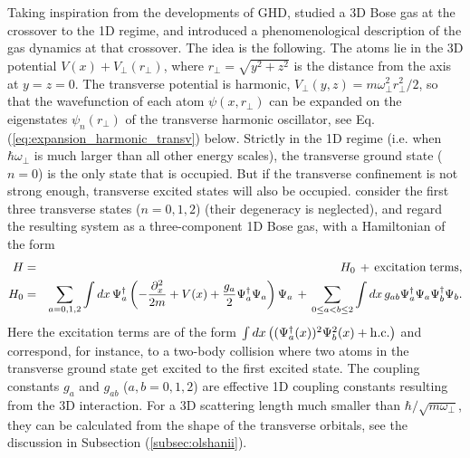 \documentclass[onecolumn,amsfonts,showpacs,superscriptaddress]{revtex4-1}
\newcommand{\comJ}[1]{{\color{orange}#1}}
\begin{document}
Taking inspiration from the developments of GHD,  \cite{moller_extension_2021} studied a 3D Bose gas at the crossover to the 1D regime, and introduced a phenomenological description of the gas dynamics at that crossover. The idea is the following. The atoms lie in the 3D potential $V(x) + V_{\perp} (r_\perp)$, where $r_\perp = \sqrt{y^2+z^2}$ is the distance from the axis at $y=z=0$. The transverse potential is harmonic, $V_{\perp} (y,z) = m \omega_\perp^2 r_\perp^2/2$, so that the wavefunction of each atom $\psi(x,r_\perp)$ can be expanded on the eigenstates $\psi_n(r_\perp)$ of the transverse harmonic oscillator, see Eq.~ (\ref{eq:expansion_harmonic_transv}) below. Strictly in the 1D regime (i.e. when $\hbar \omega_\perp$ is much larger than all other energy scales), the transverse ground state ($n=0$) is  the only state that is occupied. But if the transverse confinement is not strong enough, transverse excited states will also be occupied. \cite{moller_extension_2021} consider the first three transverse states ($n=0,1,2$) (their degeneracy is neglected), and regard the resulting system as a three-component 1D Bose gas, with a Hamiltonian of the form 
\begin{eqnarray}
    \label{eq:ham_multicomponent}
\nonumber    H &=& H_0 \, + \, {\rm excitation \; terms}  , \\
    H_0 & = & \sum_{a=0,1,2} \int dx\,  \Psi_a^\dagger \left( - \frac{\partial_x^2}{2m} + V(x) + \frac{g_a}{2} \Psi^\dagger_a \Psi_a \right)  \Psi_a \, + \, \sum_{0 \leq a<b \leq 2} \int dx \, g_{ab} \Psi^\dagger_a \Psi_a \Psi^\dagger_b \Psi_b .
\end{eqnarray}
Here the excitation terms are of the form $\int dx \left( (\Psi^\dagger_a (x))^2 \Psi_b^2(x) + {\rm h.c.} \right)$ and correspond, for instance, to a two-body collision where two atoms in the transverse ground state get excited to the first excited state. The coupling constants $g_a$ and $g_{ab}$ ($a,b = 0,1,2$) are effective 1D coupling constants resulting from the 3D interaction. For a 3D scattering length much smaller than $\hbar/\sqrt{m\omega_\perp}$, 
they can be calculated from the shape of the transverse orbitals, see the discussion in Subsection (\ref{subsec:olshanii}).
\end{document}
